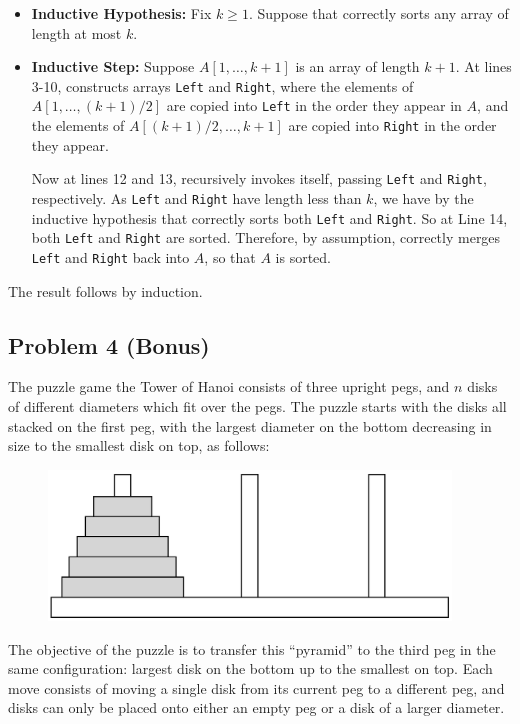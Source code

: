 \documentclass[11pt]{article}
\begin{document}
\begin{framed}
\begin{enumerate}
\begin{itemize}[label=]
		\item \textbf{Inductive Hypothesis:} Fix $k \geq 1$. Suppose that  correctly sorts any array of length at most $k$.

		\item \textbf{Inductive Step:} Suppose $A[1, \ldots, k+1]$ is an array of length $k+1$. At lines 3-10,  constructs arrays \texttt{Left} and \texttt{Right}, where the elements of $A[1, \ldots, (k+1)/2]$ are copied into \texttt{Left} in the order they appear in $A$, and the elements of $A[(k+1)/2, \ldots, k+1]$ are copied into \texttt{Right} in the order they appear.

		Now at lines 12 and 13,  recursively invokes itself, passing \texttt{Left} and \texttt{Right}, respectively. As \texttt{Left} and \texttt{Right} have length less than $k$, we have by the inductive hypothesis that  correctly sorts both \texttt{Left} and \texttt{Right}. So at Line 14, both \texttt{Left} and \texttt{Right} are sorted. Therefore, by assumption,  correctly merges \texttt{Left} and \texttt{Right} back into $A$, so that $A$ is sorted.
	\end{itemize}

	The result follows by induction.
	\end{enumerate}
\end{framed}
\newpage


\subsection*{Problem 4 (Bonus)}
The puzzle game the Tower of Hanoi consists of three upright pegs, and $n$ disks of different diameters which fit over the pegs. The puzzle starts with the disks all stacked on the first peg, with the largest diameter on the bottom decreasing in size to the smallest disk on top, as follows:
\begin{figure}[H]
	\begin{center}
		\includegraphics[height=4cm]{hanoi.png}
	\end{center}
\end{figure}
The objective of the puzzle is to transfer this ``pyramid'' to the third peg in the same configuration: largest disk on the bottom up to the smallest on top. Each move consists of moving a single disk from its current peg to a different peg, and disks can only be placed onto either an empty peg or a disk of a larger diameter. \\
\end{document}
